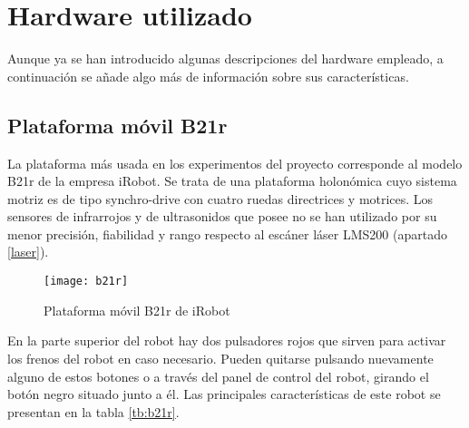 
\chapter{Hardware utilizado}\label{ap:hardware}
Aunque ya se han introducido algunas descripciones del hardware empleado, a continuación se añade algo más de información sobre sus características.

\section{Plataforma móvil B21r}
La plataforma más usada en los experimentos del proyecto corresponde al modelo B21r de la empresa iRobot. Se trata de una plataforma holonómica cuyo sistema motriz es de tipo synchro-drive con cuatro ruedas directrices y motrices. Los sensores de infrarrojos y de ultrasonidos que posee no se han utilizado por su menor precisión, fiabilidad y rango respecto al escáner láser LMS200 (apartado \ref{laser}).

\begin{figure}[h]
  \centering\texttt{[image: b21r]}\\
  \caption{Plataforma móvil B21r de iRobot}\label{fg:b21r}
\end{figure}

En la parte superior del robot hay dos pulsadores rojos que sirven para activar los frenos del robot en caso necesario. Pueden quitarse pulsando nuevamente alguno de estos botones o a través del panel de control del robot, girando el botón negro situado junto a él.
Las principales características de este robot se presentan en la tabla \ref{tb:b21r}.

